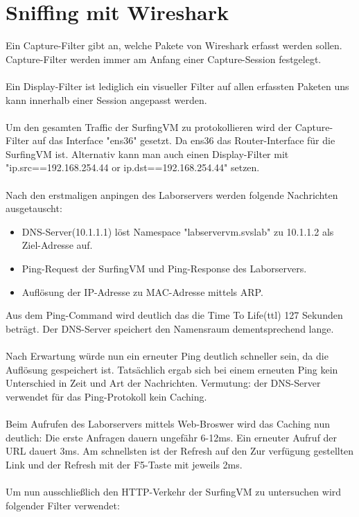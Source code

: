 \documentclass[12pt]{article}
\theoremstyle{plain}
\begin{document}
\section{Sniffing mit Wireshark}
Ein Capture-Filter gibt an, welche Pakete von Wireshark erfasst werden sollen. Capture-Filter werden immer am Anfang einer Capture-Session festgelegt. \\ \\
Ein Display-Filter ist lediglich ein visueller Filter auf allen erfassten Paketen uns kann innerhalb einer Session angepasst werden.
\\\\
Um den gesamten Traffic der SurfingVM zu protokollieren wird der Capture-Filter auf das Interface "ens36" gesetzt. Da ens36 das Router-Interface für die SurfingVM ist. Alternativ kann man auch einen Display-Filter mit "ip.src==192.168.254.44 or ip.dst==192.168.254.44" setzen. \\ \\
Nach den erstmaligen anpingen des Laborservers werden folgende Nachrichten ausgetauscht: 
\begin{itemize}
\item DNS-Server(10.1.1.1) löst Namespace "labservervm.svslab" zu 10.1.1.2 als Ziel-Adresse auf.
\item Ping-Request der SurfingVM und Ping-Response des Laborservers.
\item Auflösung der IP-Adresse zu MAC-Adresse mittels ARP.
\end{itemize}
Aus dem Ping-Command wird deutlich das die Time To Life(ttl) 127 Sekunden beträgt.
Der DNS-Server speichert den Namensraum dementsprechend lange. \\ \\
Nach Erwartung würde nun ein erneuter Ping deutlich schneller sein, da die Auflösung gespeichert ist. Tatsächlich ergab sich bei einem erneuten Ping kein Unterschied in Zeit und Art der Nachrichten. Vermutung: der DNS-Server verwendet für das Ping-Protokoll kein Caching. \\ \\
Beim Aufrufen des Laborservers mittels Web-Broswer wird das Caching nun deutlich:
Die erste Anfragen dauern ungefähr 6-12ms. Ein erneuter Aufruf der URL dauert 3ms. Am schnellsten ist der Refresh auf den Zur verfügung gestellten Link und der Refresh mit der F5-Taste mit jeweils 2ms.
\\\\
Um nun ausschließlich den HTTP-Verkehr der SurfingVM zu untersuchen wird folgender Filter verwendet: \\
\end{document}
